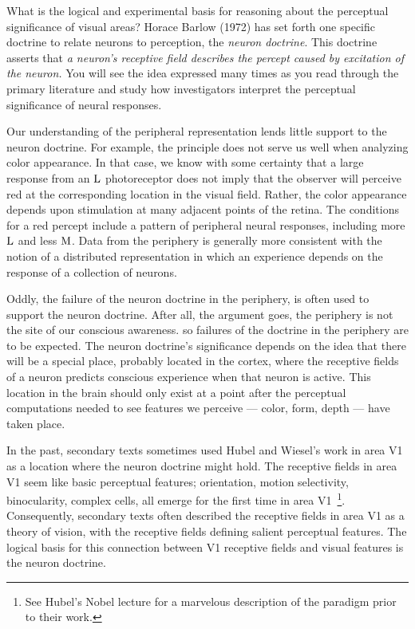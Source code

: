 \nocite{Barlow1972}
What is the logical and experimental basis for reasoning about the
perceptual significance of visual areas?
Horace Barlow (1972) has set forth one specific doctrine
to relate neurons to perception,
the {\em neuron doctrine}.
This doctrine asserts that
{\em a neuron's receptive field describes the
percept caused by excitation of the neuron.}
You will see the idea expressed many times
as you read through the primary
literature and study how investigators
interpret the perceptual significance of neural responses.

Our understanding of the peripheral representation
lends little support to the neuron doctrine.
For example, the principle does not serve us well
when analyzing color appearance.
In that case,
we know with some certainty that a large response from an $\mbox{L}$
photoreceptor does not imply that the observer will
perceive red at the corresponding location in the visual
field.
Rather, the color appearance depends upon stimulation at
many adjacent points of the retina.
The conditions for a red percept include a pattern of
peripheral neural responses, including more $\mbox{L}$ and less
$\mbox{M}$.
Data from the periphery is generally more consistent with
the notion of a distributed representation in which an
experience depends on the response of a collection of neurons.

Oddly, the failure of the neuron doctrine in the periphery,
is often used to support the neuron doctrine.
After all, the argument goes,
the periphery is not the site of our conscious awareness.
so failures of the doctrine in the periphery are to be expected.
The neuron doctrine's significance depends on the idea
that there will be a special place,
probably located in the cortex,
where the receptive fields of a neuron
predicts conscious experience when that neuron is active.
This location in the brain should only exist at a point after
the perceptual computations needed to see features
we perceive --- color, form, depth --- have taken place.

In the past, secondary texts sometimes
used Hubel and Wiesel's work in area V1
as a location where the neuron doctrine might hold.
The receptive fields in area V1 seem
like basic perceptual features;
orientation, motion selectivity, binocularity, complex cells,
all emerge for the first time in area V1~\footnote{
See Hubel's Nobel lecture for a marvelous
description of the paradigm prior to their work.
}.
Consequently,
secondary texts often described the receptive fields in area V1
as a theory of vision, with the receptive fields defining
salient perceptual features.
The logical basis for this connection between V1 receptive fields
and visual features is the neuron doctrine.

